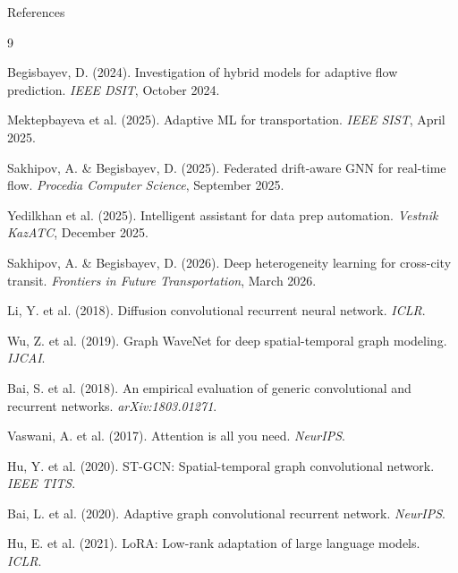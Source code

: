 \documentclass[aspectratio=169, 11pt]{beamer}
\begin{document}
\begin{frame}{References}
\scriptsize
\begin{thebibliography}{9}

Begisbayev, D. (2024).
Investigation of hybrid models for adaptive flow prediction.
\textit{IEEE DSIT}, October 2024.

Mektepbayeva et al. (2025).
Adaptive ML for transportation.
\textit{IEEE SIST}, April 2025.

Sakhipov, A. \& Begisbayev, D. (2025).
Federated drift-aware GNN for real-time flow.
\textit{Procedia Computer Science}, September 2025.

Yedilkhan et al. (2025).
Intelligent assistant for data prep automation.
\textit{Vestnik KazATC}, December 2025.

Sakhipov, A. \& Begisbayev, D. (2026).
Deep heterogeneity learning for cross-city transit.
\textit{Frontiers in Future Transportation}, March 2026.

Li, Y. et al. (2018).
Diffusion convolutional recurrent neural network.
\textit{ICLR}.

Wu, Z. et al. (2019).
Graph WaveNet for deep spatial-temporal graph modeling.
\textit{IJCAI}.

Bai, S. et al. (2018).
An empirical evaluation of generic convolutional and recurrent networks.
\textit{arXiv:1803.01271}.

Vaswani, A. et al. (2017).
Attention is all you need.
\textit{NeurIPS}.

Hu, Y. et al. (2020).
ST-GCN: Spatial-temporal graph convolutional network.
\textit{IEEE TITS}.

Bai, L. et al. (2020).
Adaptive graph convolutional recurrent network.
\textit{NeurIPS}.

Hu, E. et al. (2021).
LoRA: Low-rank adaptation of large language models.
\textit{ICLR}.

\end{thebibliography}
\end{frame}
\end{document}
